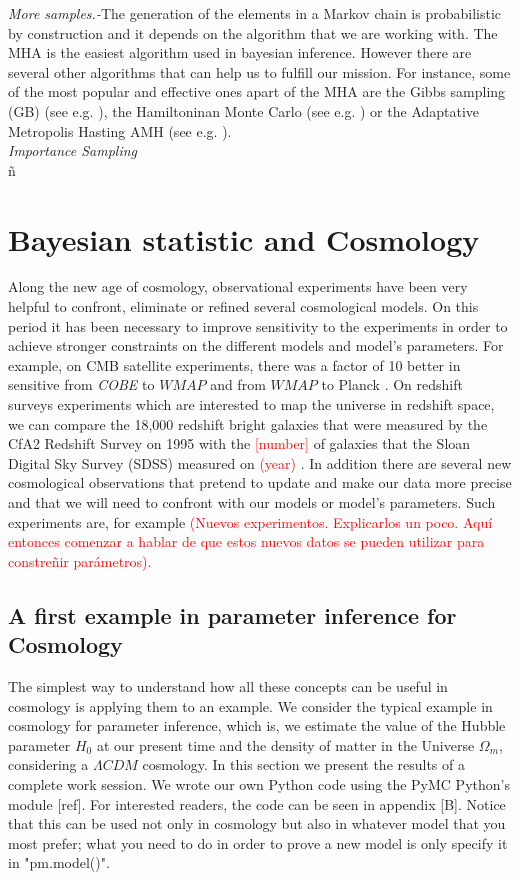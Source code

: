 \documentclass[onecolumn,           %
               showpacs,            %
               preprintnumbers,     %
               aps,                 %
               prl,          	    %
               letterpaper,             %
               superscriptaddress,      %
               nofootinbib,         %
               tightenlines,        %
               floats,floatfix      %
               ,usenatbib,
               ]{revtex4-1}
\begin{document}
\textit{More samples.-}The generation of the elements in a Markov chain is probabilistic by construction and it depends on the algorithm that we are working with. The MHA is the easiest algorithm used in bayesian inference. However there are several other algorithms that can help us to fulfill our mission. For instance, some of the most popular and effective ones apart of the MHA are the Gibbs sampling (GB) (see e.g. \cite{gibbs1,gibbs2}), the Hamiltoninan Monte Carlo (see e.g. \cite{hamiltonian1,Hamiltonian2}) or the Adaptative Metropolis Hasting AMH (see e.g. \cite{importance}).\\

\textit{Importance Sampling}
\\ ñ\\

\section{Bayesian statistic and Cosmology}

Along the new age of cosmology, observational experiments have been very helpful to confront, eliminate or refined several cosmological models. On this period it has been necessary to improve sensitivity to the experiments in order to achieve stronger constraints on the different models and model's parameters. For example, on CMB satellite experiments, there was a factor of 10 better in sensitive from \textit{COBE} to $WMAP$ and from $WMAP$ to Planck \cite{cmbex}.  On redshift surveys experiments which are interested to map the universe in redshift space, we can compare the 18,000 redshift bright galaxies that were measured by the CfA2 Redshift Survey on 1995 with the \textcolor{red}{[number]} of galaxies that the Sloan Digital Sky Survey (SDSS) measured on \textcolor{red}{(year)} \cite{observ}. In addition there are several new cosmological observations that pretend to update and make our data more precise and that we will need to confront with our models or model's parameters. Such experiments are, for example \textcolor{red}{(Nuevos experimentos. Explicarlos un poco. Aqu\'i entonces comenzar a hablar de que estos nuevos datos se pueden utilizar para constre\~nir par\'ametros).}

\subsection{A first example in parameter inference for Cosmology}

The simplest way to understand how all these concepts can be useful in cosmology is applying them to an example. We consider the typical example in cosmology for parameter inference, which is, we estimate the value of the Hubble parameter $H_0$ at our present time and the density of matter in the Universe $\Omega_m$, considering a $\Lambda CDM$ cosmology. In this section we present the results of a complete work session. We wrote our own Python code using the PyMC Python's module [ref]. For interested readers, the code can be seen in appendix [B]. Notice that this can be used not only in cosmology but also in whatever model that you most prefer; what you need to do in order to prove a new model is only specify it in "pm.model()". 
\end{document}

